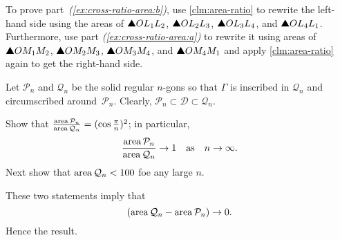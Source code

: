 To prove part~\textit{(\ref{ex:cross-ratio-area:b})}, use \ref{clm:area-ratio} to rewrite the left-hand side using the areas of $\solidtriangle OL_1L_2$, $\solidtriangle OL_2L_3$, $\solidtriangle OL_3L_4$, and $\solidtriangle OL_4L_1$.
Furthermore, use part \textit{(\ref{ex:cross-ratio-area:a})} to rewrite it using areas of $\solidtriangle OM_1M_2$, $\solidtriangle OM_2M_3$, $\solidtriangle OM_3M_4$, and $\solidtriangle OM_4M_1$ and apply \ref{clm:area-ratio} again to get the right-hand side.


Let $\mathcal{P}_n$ and $\mathcal{Q}_n$ be the solid regular $n$-gons
so that $\Gamma$ is inscribed in $\mathcal{Q}_n$ and circumscribed around~$\mathcal{P}_n$.
Clearly,
$\mathcal{P}_n\subset\mathcal{D}\subset\mathcal{Q}_n$.

Show that 
$\tfrac{\mathop{\rm area}\nolimits\mathcal{P}_n}{\mathop{\rm area}\nolimits\mathcal{Q}_n}=(\cos\tfrac\pi n)^2$;
in particular, 
$$\frac{\mathop{\rm area}\nolimits\mathcal{P}_n}{\mathop{\rm area}\nolimits\mathcal{Q}_n}\to 1
\quad
\text{as}
\quad
n\to\infty.$$
Next show that $\mathop{\rm area}\nolimits\mathcal{Q}_n<100$ foe any large $n$.

These two statements imply that
\[(\mathop{\rm area}\nolimits\mathcal{Q}_n-\mathop{\rm area}\nolimits\mathcal{P}_n)\to 0.\]
Hence the result.

\spell{\end{multicols}}{}

\newpage
